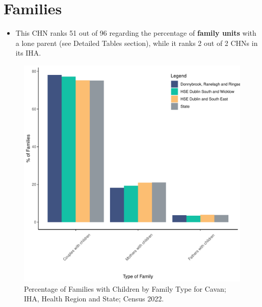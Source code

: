 \documentclass{article}
\begin{document}
\section{Families}\label{sect:Fam}
\begin{itemize}
\item This CHN ranks  51 out of 96 regarding the percentage of \textbf{family units} with a lone parent (see Detailed Tables section), while it ranks   2 out of 2 CHNs in its IHA.
\end{itemize}
\begin{figure}[H]
	\centering
	\includegraphics[width = 150mm]{../figures/FamED.pdf}
	\caption{Percentage of Families with Children by Family Type for Cavan; IHA, Health Region and State; Census 2022.}
	\label{fig:vbnv}
	\end{figure}
	
\end{document}
